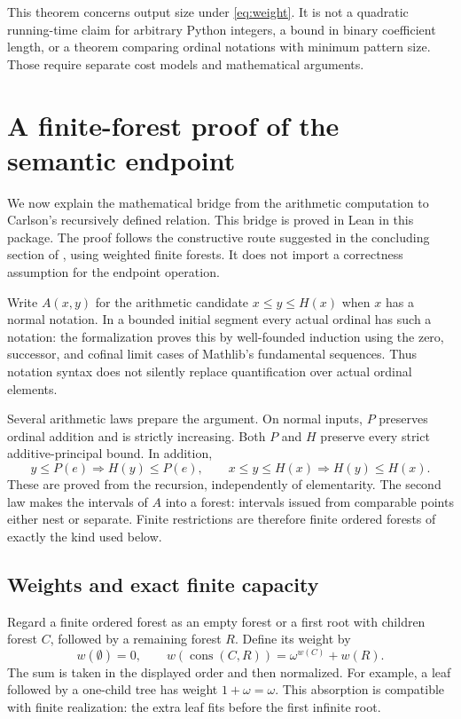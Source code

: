 \documentclass[11pt]{article}
\begin{document}
This theorem concerns output size under \eqref{eq:weight}. It is not a
quadratic running-time claim for arbitrary Python integers, a bound in
binary coefficient length, or a theorem comparing ordinal notations
with minimum pattern size. Those require separate cost models and
mathematical arguments.

\section{A finite-forest proof of the semantic endpoint}\label{sec:semantic}

We now explain the mathematical bridge from the arithmetic computation to
Carlson's recursively defined relation. This bridge is proved in Lean in
this package. The proof follows the constructive route suggested in the
concluding section of \cite{Carlson1999}, using weighted finite forests.
It does not import a correctness assumption for the endpoint operation.

Write $A(x,y)$ for the arithmetic candidate
$x\leq y\leq H(x)$ when $x$ has a normal notation. In a bounded initial
segment every actual ordinal has such a notation: the formalization proves
this by well-founded induction using the zero, successor, and cofinal
limit cases of Mathlib's fundamental sequences. Thus notation syntax does
not silently replace quantification over actual ordinal elements.

Several arithmetic laws prepare the argument. On normal inputs, $P$
preserves ordinal addition and is strictly increasing. Both $P$ and $H$
preserve every strict additive-principal bound. In addition,
\[
 y\leq P(e)\Longrightarrow H(y)\leq P(e),\qquad
 x\leq y\leq H(x)\Longrightarrow H(y)\leq H(x).
\]
These are proved from the recursion, independently of elementarity. The
second law makes the intervals of $A$ into a forest: intervals issued
from comparable points either nest or separate. Finite restrictions are
therefore finite ordered forests of exactly the kind used below.

\subsection{Weights and exact finite capacity}

Regard a finite ordered forest as an empty forest or a first root with
children forest $C$, followed by a remaining forest $R$. Define its
weight by
\[
 w(\emptyset)=0,\qquad
 w(\operatorname{cons}(C,R))=\omega^{w(C)}+w(R).
\]
The sum is taken in the displayed order and then normalized. For example,
a leaf followed by a one-child tree has weight $1+\omega=\omega$.
This absorption is compatible with finite realization: the extra leaf
fits before the first infinite root.
\end{document}
